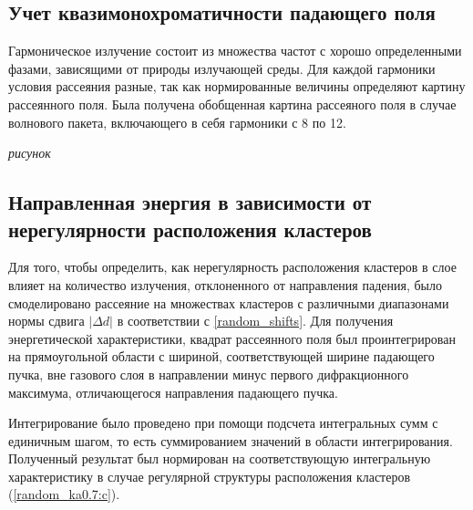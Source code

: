 \subsection{Учет квазимонохроматичности падающего поля}

Гармоническое излучение состоит из множества частот с хорошо определенными фазами, зависящими от природы излучающей среды. Для каждой гармоники условия рассеяния разные, так как нормированные величины определяют картину рассеянного поля. Была получена обобщенная картина рассеяного поля в случае волнового пакета, включающего в себя гармоники с 8 по 12.

\textit{рисунок}

\subsection{Направленная энергия в зависимости от нерегулярности расположения кластеров}

Для того, чтобы определить, как нерегулярность расположения кластеров в слое влияет на количество излучения, отклоненного от направления падения, было смоделировано рассеяние на множествах кластеров с различными диапазонами нормы сдвига $|\Delta d|$ в соответствии с \autoref{random_shifts}. Для получения энергетической характеристики, квадрат рассеянного поля был проинтегрирован на прямоугольной области с шириной, соответствующей ширине падающего пучка, вне газового слоя в направлении минус первого дифракционного максимума, отличающегося направления падающего пучка. 

Интегрирование было проведено при помощи подсчета интегральных сумм с единичным шагом, то есть суммированием значений в области интегрирования. Полученный результат был нормирован на соответствующую интегральную характеристику в случае регулярной структуры расположения кластеров (\autoref{random_ka0.7:c}).

